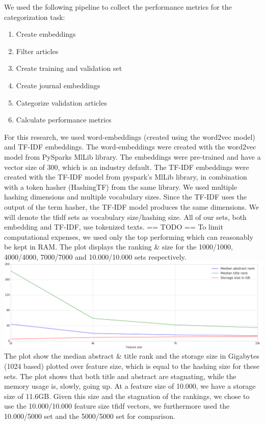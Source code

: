 \documentclass[../../Thesis.tex]{subfiles}
\begin{document}
We used the following pipeline to collect the performance metrics for the categorization task:
\begin{enumerate}
\item{Create embeddings}
\item{Filter articles}
\item{Create training and validation set}
\item{Create journal embeddings}
\item{Categorize validation articles}
\item{Calculate performance metrics}
\end{enumerate}

For this research, we used word-embeddings (created using the word2vec model) and TF-IDF embeddings. The word-embeddings were created with the word2vec model from PySparks MlLib library\cite{PysparkMlLib}. The embeddings were pre-trained and have a vector size of 300, which is an industry default. The TF-IDF embeddings were created with the TF-IDF model from pyspark's MlLib library\cite{PysparkMlLib}, in combination with a token hasher (HashingTF) from the same library. We used multiple hashing dimensions and multiple vocabulary sizes. Since the TF-IDF uses the output of the term hasher, the TF-IDF model produces the same dimensions. We will denote the tfidf sets as vocabulary size/hashing size. All of our sets, both embedding and TF-IDF, use tokenized texts.
== TODO ==
To limit computational expenses, we used only the top performing which can reasonably be kept in RAM. The plot displays the ranking \& size for the 1000/1000, 4000/4000, 7000/7000 and 10.000/10.000 sets respectively.\\
\includegraphics[width=6in]{Plots/tfidf_selection_plot}\\
The plot show the median abstract \& title rank and the storage size in Gigabytes (1024 based) plotted over feature size, which is equal to the hashing size for these sets. The plot shows that both title and abstract are stagnating, while the memory usage is, slowly, going up. At a feature size of 10.000, we have a storage size of 11.6GB. Given this size and the stagnation of the rankings, we chose to use the 10.000/10.000 feature size tfidf vectors, we furthermore used the 10.000/5000 set and the 5000/5000 set for comparison.
\end{document}
